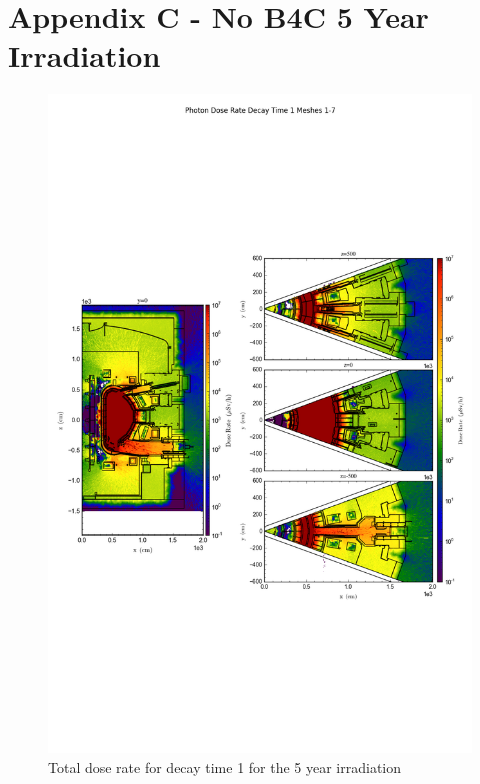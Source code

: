 \documentclass[12pt]{article}
\begin{document}
\section{Appendix C - No B4C 5 Year Irradiation}
\begin{figure}[ht!]
\centering
\includegraphics[trim={0cm 8cm, 0cm 8cm},clip,scale=0.75]{../plots/final_model/5year/Photon_Dose_Rate_Decay_Time_1_Meshes_1-7.png}
\caption{Total dose rate for decay time 1 for the 5 year irradiation}
\label{fig:photons_5y_dc1_nob4c_dose}
\end{figure}
\end{document}
